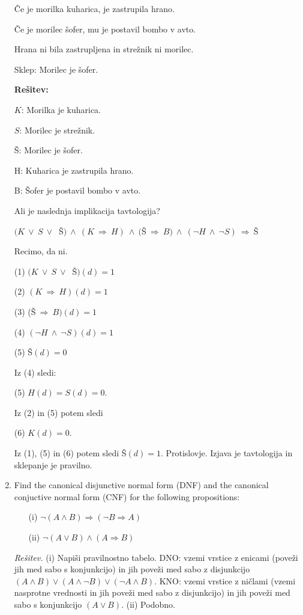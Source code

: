 \documentclass[11pt,paper=b5,footinclude,headinclude]{scrbook} %
\def\ali {{~\vee~}}
\def\inn {{~\wedge~}}
\def\sledi {{~\Rightarrow~}}
\theoremstyle{remark}
\theoremstyle{definition} %
\theoremstyle{theorem} %
\begin{document}
\begin{enumerate}
Če je morilka kuharica, je zastrupila hrano.

Če je morilec šofer, mu je postavil bombo v avto.

Hrana ni bila zastrupljena in strežnik ni morilec.

Sklep: Morilec je šofer.

\bigskip

\textbf{ Rešitev:}

$K$: Morilka je kuharica.

$S$: Morilec je strežnik.

Š: Morilec je šofer.

H: Kuharica je zastrupila hrano.

B: Šofer je postavil bombo v avto.

\medskip
Ali je naslednja implikacija tavtologija?

$(K\ali S\ali$ \v S$)\inn(K\sledi H)\inn($Š$\sledi B)\inn(\neg H\inn \neg S)\sledi $Š

\bigskip
Recimo, da ni.

(1) $(K\ali S\ali$ \v S$)(d) = 1$

(2) $(K\sledi H)(d) = 1$

(3) (Š$\sledi B)(d) = 1$

(4) $(\neg H\inn \neg S)(d) = 1$

(5) Š$(d) = 0$

Iz (4) sledi:

(5)  $H(d) = S(d) = 0$.

Iz (2) in (5) potem sledi

(6) $K(d) = 0$.

Iz (1), (5) in (6) potem sledi Š$(d) = 1$. Protislovje. Izjava je tavtologija  in sklepanje je pravilno.



\medskip

\item Find the canonical disjunctive normal form (DNF) and the canonical conjuctive normal form (CNF) for the following propositions:
\begin{enumerate}
\item[(i)] $\neg(A\wedge B) \Rightarrow (\neg B \Rightarrow A)$
\item[(ii)] $\neg (A\vee B) \wedge (A \Rightarrow B)$
\end{enumerate}

\emph{Rešitev.} (i) Napiši pravilnostno tabelo. DNO: vzemi vrstice z enicami (poveži jih med sabo s konjunkcijo) in jih poveži med sabo z disjunkcijo
$(A\wedge B) \vee (A\wedge \neg B) \vee (\neg A \wedge B)$. KNO: vzemi vrstice z ničlami (vzemi nasprotne vrednosti in jih poveži med sabo z disjunkcijo) in jih poveži med sabo s konjunkcijo $(A \vee B)$. (ii) Podobno.


\end{enumerate}
\end{document}
